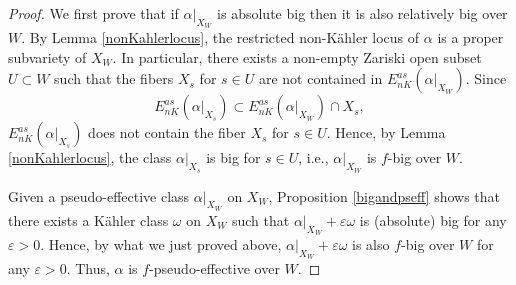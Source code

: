 \documentclass[12pt]{amsart}
\numberwithin{equation}{section}
\theoremstyle{definition}
\theoremstyle{plain}
\newtheorem*{thm A*}{Theorem A}
\newtheorem*{thm B*}{Theorem B}
\newtheorem*{thm C*}{Theorem C}
\newtheorem*{thm D*}{Theorem D}
\theoremstyle{definition}
\renewcommand{\1}{\mathds{1}}
\renewcommand{\>}{\rightarrow}
\begin{document}
\begin{proof}
We first prove that if $\alpha|_{X_W}$ is absolute big then it is also relatively big over $W$. By Lemma \ref{nonKahlerlocus}, the restricted non-K\"ahler locus of $\alpha$ is a proper subvariety of $X_W$. 
In particular, there exists a non-empty Zariski open subset $U\subset W$ such that the fibers $X_s$ for $s\in U$ are not contained in $E_{nK}^{as}(\alpha|_{X_W})$. Since $$E_{nK}^{as}(\alpha|_{X_s}) \subset E_{nK}^{as}(\alpha|_{X_W})\cap X_s,$$ $E_{nK}^{as}(\alpha|_{X_s})$ does not contain the fiber $X_s$ for $s\in U$. Hence, by Lemma \ref{nonKahlerlocus}, the class $\alpha|_{X_s}$ is big for $s\in U$, i.e., $\alpha|_{X_W}$ is $f$-big over $W$. 

Given a pseudo-effective class $\alpha|_{X_W}$ on $X_W$, Proposition \ref{bigandpseff} shows that there exists a K\"ahler class $\omega$ on $X_W$ such that $\alpha|_{X_W}  + \varepsilon \omega$ is (absolute) big for any $\varepsilon >0$. Hence, by what we just proved above, $\alpha|_{X_W} + \varepsilon \omega$ is also $f$-big over $W$ for any $\varepsilon >0$. Thus, $\alpha$ is $f$-pseudo-effective over $W$. 
\end{proof}
\end{document}
